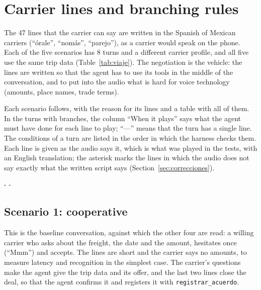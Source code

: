 \documentclass[11pt]{article}
\makeatletter
\newcommand{\need}[1]{\par\penalty-100\begingroup
  \setlength{\dimen@}{#1}%
  \dimen@ii\pagegoal \advance\dimen@ii-\pagetotal
  \ifdim\dimen@>\dimen@ii \ifdim\dimen@ii>\z@\vfil\fi \penalty-\@M \fi
  \endgroup}
\newcommand{\RGuionLineas}{47}
\makeatother
\begin{document}
\section{Carrier lines and branching rules}
\label{sec:lineas}

The \RGuionLineas{} lines that the carrier can say are written in the Spanish of
Mexican carriers (``órale'', ``nomás'', ``parejo''), as a carrier would speak on the
phone. Each of the five scenarios has 8 turns and a different carrier profile, and
all five use the same trip data (Table~\ref{tab:viaje}). The negotiation is the
vehicle: the lines are written so that the agent has to use its tools in the middle
of the conversation, and to put into the audio what is hard for voice technology
(amounts, place names, trade terms).

Each scenario follows, with the reason for its lines and a table with all of them.
In the turns with branches, the column ``When it plays'' says what the agent must
have done for each line to play; ``---'' means that the turn has a single line.
The conditions of a turn are listed in the order in which the harness checks them.
Each line is given as the audio says it, which is what was played in the tests,
with an English translation; the asterisk marks the lines in which the audio does
not say exactly what the written script says (Section~\ref{sec:correcciones}).

\need{9cm}
\subsection{Scenario 1: cooperative}

This is the baseline conversation, against which the other four are read: a willing
carrier who asks about the freight, the date and the amount, hesitates once
(``Mmm'') and accepts. The lines are short and the carrier says no amounts, to
measure latency and recognition in the simplest case. The carrier's questions make
the agent give the trip data and its offer, and the last two lines close the deal,
so that the agent confirms it and registers it with \texttt{registrar\_acuerdo}.
\end{document}
